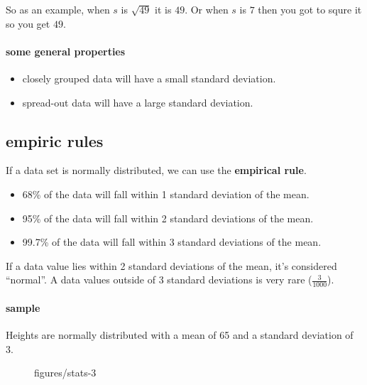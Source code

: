 So as an example, when $s$ is $\sqrt{49}$ it is $49$. Or when  $s$ is $7$ then
you got to squre it so you get $49$.

\paragraph{some general properties}
\begin{itemize}
    \item closely grouped data will have a small standard deviation.
    \item spread-out data will have a large standard deviation.
\end{itemize}

\subsection{empiric rules}
If a data set is normally distributed, we can use the \textbf{empirical rule}.
\begin{itemize}
    \item 68\% of the data will fall within 1 standard deviation of the mean.
    \item 95\% of the data will fall within 2 standard deviations of the mean.
    \item 99.7\% of the data will fall within 3 standard deviations of the mean.
\end{itemize}

If a data value lies within 2 standard deviations of the mean, it's considered
``normal''. A data values outside of 3 standard deviations is very rare ($\frac{3}{1000}$).

\paragraph{sample}
Heights are normally distributed with a mean of 65 and a standard deviation of 3.


\begin{figure}[ht]
    \centering
    \caption{figures/stats-3}
    \label{fig:stats-3}
\end{figure}



